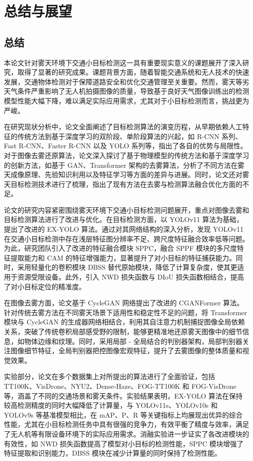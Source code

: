 \section{总结与展望\label{结论}}

\subsection{总结}

本论文针对雾天环境下交通小目标检测这一具有重要现实意义的课题展开了深入研究，取得了显著的研究成果。课题背景方面，随着智能交通系统和无人技术的快速发展，交通物体检测对于保障道路安全和优化交通管理至关重要。然而，雾天等劣天气条件严重影响了无人机拍摄图像的质量，导致基于良好天气图像训练出的检测模型性能大幅下降，难以满足实际应用需求，尤其对于小目标检测而言，挑战更为严峻。

在研究现状分析中，论文全面阐述了目标检测算法的演变历程，从早期依赖人工特征的传统方法到基于深度学习的双阶段、单阶段算法的兴起，如 R-CNN 系列、Fast R-CNN、Faster R-CNN 以及 YOLO 系列等，指出了各自的优势与局限性。对于图像去雾还原算法，论文深入探讨了基于物理模型的传统方法和基于深度学习的创新方法，如基于 GAN、Transformer 架构的去雾算法，分析了不同方法在雾天成像原理、先验知识利用以及特征学习等方面的差异与进展。同时，论文还对雾天目标检测技术进行了梳理，指出了现有方法在去雾与检测算法融合优化方面的不足。

论文的研究内容紧密围绕雾天环境下交通小目标检测问题展开，重点对图像去雾和目标检测算法进行了改进与优化。在目标检测方面，以 YOLOv11 算法为基础，提出了改进的 EX-YOLO 算法。通过对其网络结构的深入分析，发现 YOLOv11 在交通小目标检测中存在浅层特征图分辨率不足、跨尺度特征融合效率低等问题。为此，研究团队引入了改进的特征融合模块 SPPC，融合 SPPF 模块的多尺度特征提取能力和 CAM 的特征增强能力，显著提升了对小目标的特征捕获能力。同时，采用轻量化的卷积模块 DBSS 替代原始模块，降低了计算复杂度，使其更适用于资源受限设备。此外，引入 NWD 损失函数与 DIoU 损失函数相结合，提高了对小目标定位的精准度。

在图像去雾方面，论文基于 CycleGAN 网络提出了改进的 CGANFormer 算法。针对传统去雾方法在不同雾天场景下适用性和稳定性不足的问题，将 Transformer 模块与 CycleGAN 的生成器网络相结合，利用其自注意力机制捕捉图像全局依赖关系，突破了传统卷积局部感受野的限制，能够更精准地还原雾天图像中的细节信息，如物体边缘和纹理。同时，采用局部 - 全局结合的判别器架构，局部判别器关注图像细节特征，全局判别器把控图像宏观特征，提升了去雾图像的整体质量和视觉效果。

实验部分，论文在多个数据集上对所提出的算法进行了全面验证，包括 TT100K、VisDrone、NYU2、Dense-Haze、FOG-TT100K 和 FOG-VisDrone 等，涵盖了不同的交通场景和雾天条件。实验结果表明，EX-YOLO 算法在保持较高检测精度的同时大幅降低了计算量，与 YOLOv11s、YOLOv10s 和 YOLOv9s 等基准模型相比，在 mAP、P、R 等关键指标上均展现出优异的综合性能，尤其在小目标检测任务中具有很强的竞争力，有效平衡了精度与效率，满足了无人机等有限设备环境下的实际应用需求。消融实验进一步证实了各改进模块的有效性，如 NWD 损失函数提高了模型对小目标的检测性能，SPPC 模块增强了特征提取和识别能力，DBSS 模块在减少计算量的同时保持了检测性能。

